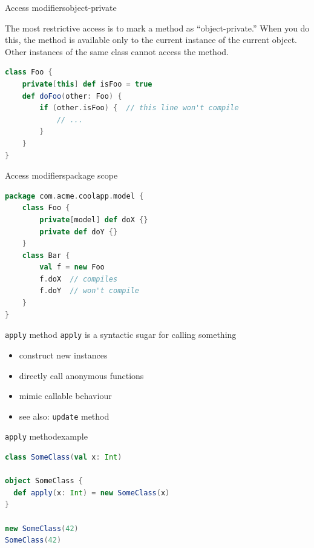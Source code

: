 \documentclass[aspectratio=169]{beamer}
\begin{document}
\begin{frame}[fragile]{Access modifiers}{object-private}
\begin{block}{}
The most restrictive access is to mark a method as “object-private.” When you do this, the method is
available only to the current instance of the current object. Other instances of the same class
cannot access the method.
\end{block}
\begin{lstlisting}[style=scala,language=scala]
class Foo {
    private[this] def isFoo = true
    def doFoo(other: Foo) {
        if (other.isFoo) {  // this line won't compile
            // ...
        }
    }
}
\end{lstlisting}
\end{frame}

\begin{frame}[fragile]{Access modifiers}{package scope}
\begin{lstlisting}[style=scala,language=scala]
package com.acme.coolapp.model {
    class Foo {
        private[model] def doX {}
        private def doY {}
    }
    class Bar {
        val f = new Foo
        f.doX  // compiles
        f.doY  // won't compile
    }
}
\end{lstlisting}
\end{frame}

\begin{frame}{\texttt{apply} method}
  \texttt{apply} is a syntactic sugar for calling something
  \begin{itemize}
    \item construct new instances
    \item directly call anonymous functions
    \item mimic callable behaviour
    \item see also: \texttt{update} method
  \end{itemize}
\end{frame}

\begin{frame}[fragile]{\texttt{apply} method}{example}
\begin{lstlisting}[style=scala,language=scala]
class SomeClass(val x: Int)

object SomeClass {
  def apply(x: Int) = new SomeClass(x)
}

new SomeClass(42)
SomeClass(42)
\end{lstlisting}
\end{frame}
\end{document}

